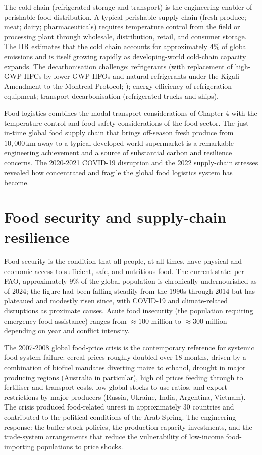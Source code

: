 The cold chain (refrigerated storage and transport) is the engineering enabler of perishable-food distribution. A typical perishable supply chain (fresh produce; meat; dairy; pharmaceuticals) requires temperature control from the field or processing plant through wholesale, distribution, retail, and consumer storage. The IIR estimates that the cold chain accounts for approximately $4\%$ of global emissions and is itself growing rapidly as developing-world cold-chain capacity expands. The decarbonisation challenge: refrigerants (with replacement of high-GWP HFCs by lower-GWP HFOs and natural refrigerants under the Kigali Amendment to the Montreal Protocol; \cite{law:kigali-amendment-2016}); energy efficiency of refrigeration equipment; transport decarbonisation (refrigerated trucks and ships).

Food logistics combines the modal-transport considerations of Chapter 4 with the temperature-control and food-safety considerations of the food sector. The just-in-time global food supply chain that brings off-season fresh produce from $10{,}000\,\text{km}$ away to a typical developed-world supermarket is a remarkable engineering achievement and a source of substantial carbon and resilience concerns. The 2020-2021 COVID-19 disruption and the 2022 supply-chain stresses revealed how concentrated and fragile the global food logistics system has become.

\section{Food security and supply-chain resilience}

Food security is the condition that all people, at all times, have physical and economic access to sufficient, safe, and nutritious food. The current state: per FAO, approximately $9\%$ of the global population is chronically undernourished as of 2024; the figure had been falling steadily from the 1990s through 2014 but has plateaued and modestly risen since, with COVID-19 and climate-related disruptions as proximate causes. Acute food insecurity (the population requiring emergency food assistance) ranges from $\approx 100$ million to $\approx 300$ million depending on year and conflict intensity.

The 2007-2008 global food-price crisis \cite{paper:headey-fan-2008} is the contemporary reference for systemic food-system failure: cereal prices roughly doubled over $18$ months, driven by a combination of biofuel mandates diverting maize to ethanol, drought in major producing regions (Australia in particular), high oil prices feeding through to fertiliser and transport costs, low global stocks-to-use ratios, and export restrictions by major producers (Russia, Ukraine, India, Argentina, Vietnam). The crisis produced food-related unrest in approximately $30$ countries and contributed to the political conditions of the Arab Spring. The engineering response: the buffer-stock policies, the production-capacity investments, and the trade-system arrangements that reduce the vulnerability of low-income food-importing populations to price shocks.

